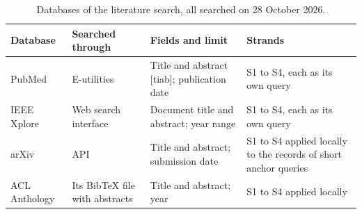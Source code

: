 \begin{table}[H]
\centering
\begin{singlespace}
\caption[Databases of the literature search]{Databases of the literature
search, all searched on 28 October 2026.}
\label{tab:lit-databases}
\small
\begin{tabularx}{\textwidth}{@{}>{\raggedright\arraybackslash}p{2.3cm}>{\raggedright\arraybackslash}p{3.0cm}>{\raggedright\arraybackslash}p{3.7cm}>{\raggedright\arraybackslash}X@{}}
\toprule
\textbf{Database} & \textbf{Searched through} & \textbf{Fields and limit} & \textbf{Strands} \\
\midrule
PubMed & E-utilities & Title and abstract [tiab]; publication date & S1 to S4, each as its own query \\
IEEE Xplore & Web search interface & Document title and abstract; year range & S1 to S4, each as its own query \\
arXiv & API & Title and abstract; submission date & S1 to S4 applied locally to the records of short anchor queries \\
ACL Anthology & Its BibTeX file with abstracts & Title and abstract; year & S1 to S4 applied locally \\
\bottomrule
\end{tabularx}
\end{singlespace}
\end{table}


